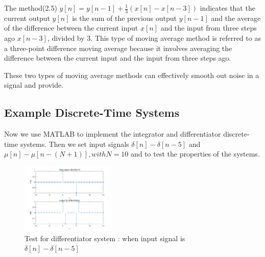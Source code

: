 \documentclass[journal]{IEEEtran}
\begin{document}
The method(2.5) $y[n] = y[n-1] + \frac{1}{3}(x[n] - x[n-3])$ indicates that the current output $y[n]$ is the sum of the previous output $y[n-1]$ and the average of the difference between the current input $x[n]$ and the input from three steps ago $x[n-3]$, divided by 3. This type of moving average method is referred to as a three-point difference moving average because it involves averaging the difference between the current input and the input from three steps ago.

These two types of moving average methods can effectively smooth out noise in a signal and provide.




 


\subsection{Example Discrete-Time Systems}
Now we use MATLAB to implement the integrator and differentiator discrete-time systems. Then we set input signals $\delta[n]-\delta[n-5]$ and $\mu[n]-\mu[n-(N+1)], with N=10$ and to test the properties of the systems.
\begin{figure}[H]
   \centering
   \includegraphics[width=0.4\textwidth]{2.3.1.png} %
   \caption{Test for differentiator system : when input signal is $\delta[n]-\delta[n-5]$}
   \label{fig:2.3.1} 
\end{figure}
\end{document}
